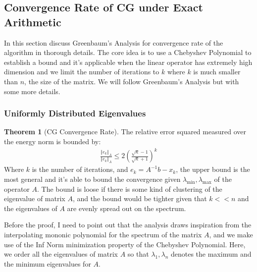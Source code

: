 \documentclass[]{article}
\theoremstyle{definition}
\newtheorem{theorem}{Theorem}            %
\begin{document}
    \subsection{Convergence Rate of CG under Exact Arithmetic}
        In this section discuss Greenbaum's Analysis for convergence rate of the algorithm\cite{book:greenbaum} in thorough details. The core idea is to use a Chebyshev Polynomial to establish a bound and it's applicable when the linear operator has extremely high dimension and we limit the number of iterations to $k$ where $k$ is much smaller than $n$, the size of the matrix. We will follow Greenbaum's Analysis but with some more details. 
        \subsubsection{Uniformly Distributed Eigenvalues}
            \begin{theorem}[CG Convergence Rate]\label{theorem:CG_Convergence_Rate}
                The relative error squared measured over the energy norm is bounded by: 
                \begin{align}
                    \frac{\Vert e_k\Vert_A}{\Vert e_k\Vert_A}
                    \le 2 \left(
                            \frac{\sqrt{\kappa} - 1}{\sqrt{\kappa} + 1}
                    \right)^k
                \end{align}
                Where $k$ is the number of iterations, and $e_k = A^{-1}b - x_k$, the upper bound is the most general and it's able to bound the convergence given $\lambda_{\min}, \lambda_{\max}$ of the operator $A$. The bound is loose if there is some kind of clustering of the eigenvalue of matrix $A$, and the bound would be tighter given that $k<<n$ and the eigenvalues of $A$ are evenly spread out on the spectrum. 
            \end{theorem}
            Before the proof, I need to point out that the analysis draws inspiration from the interpolating mononic polynomial for the spectrum of the matrix $A$, and we make use of the Inf Norm minimization property of the Chebyshev Polynomial. Here, we order all the eigenvalues of matrix $A$ so that $\lambda_1, \lambda_n$ denotes the maximum and the minimum eigenvalues for $A$. 
\end{document}
